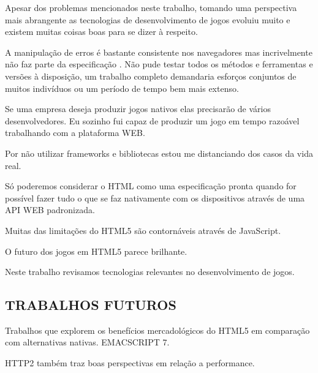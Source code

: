 \begin{draft}
Apesar dos problemas mencionados neste trabalho, tomando uma perspectiva mais
abrangente as tecnologias de desenvolvimento de jogos evoluiu muito e existem muitas coisas boas para se dizer à respeito.

A manipulação de erros é bastante consistente nos navegadores mas 
incrivelmente não faz parte da especificação \autocite{howBrowsersWork}.
Não pude testar todos os métodos e ferramentas e versões à
disposição, um trabalho completo demandaria esforços conjuntos de
muitos indivíduos ou um período de tempo bem mais extenso. 

Se uma empresa deseja produzir jogos nativos elas precisarão de vários
desenvolvedores. Eu sozinho fui capaz de produzir um jogo em tempo
razoável trabalhando com a plataforma WEB.

Por não utilizar frameworks e bibliotecas estou me distanciando
dos casos da vida real.

Só poderemos considerar o HTML como uma especificação pronta quando
for possível fazer tudo o que se faz nativamente com os dispositivos
através de uma API WEB padronizada.

Muitas das limitações do HTML5 são contornáveis através de JavaScript.

O futuro dos jogos em HTML5 parece brilhante.

Neste trabalho revisamos tecnologias relevantes no desenvolvimento de
jogos.

\subsection{TRABALHOS FUTUROS}

Trabalhos que explorem os benefícios mercadológicos do HTML5 em comparação com alternativas nativas.
EMACSCRIPT 7.

HTTP2 também traz boas perspectivas em relação a performance.

\end{draft}
